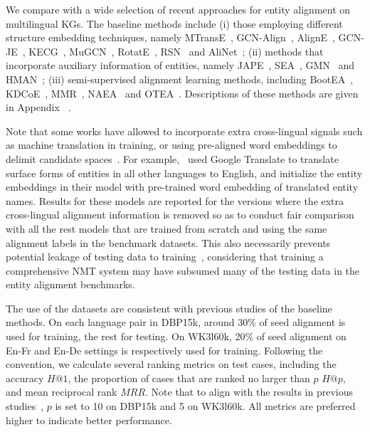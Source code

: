 \documentclass[11pt,a4paper]{article}
\makeatletter
\newcommand{\stitle}[1]{\vspace{2ex} \noindent{\bf #1}}
\def\hitsone{\mathit{H}\mbox{@}1}
\def\hitsk{\mathit{H}\mbox{@}p}
\def\mrr{\mathit{MRR}}
\makeatother
\begin{document}
\stitle{Baseline methods.}
We compare with a wide selection of recent approaches for entity alignment on multilingual KGs.
The baseline methods include (i) those employing different structure embedding techniques, namely 
MTransE~\cite{chen2017multigraph},  GCN-Align~\cite{wang2018cross}, AlignE~\cite{sun2018bootstrapping}, 
GCN-JE~\cite{wu2019jointly},
KECG~\cite{li2019semi},
MuGCN~\cite{cao2019multi}, RotatE~\cite{sun2019rotate}, 
RSN~\cite{guo2019learning} and AliNet~\cite{sun2020alinet}; 
(ii) methods that incorporate auxiliary information of entities, namely JAPE~\cite{sun2017cross}, SEA~\cite{pei2019deg}, GMN~\cite{xu2019cross} and HMAN~\cite{yang2019aligning};
(iii) semi-supervised alignment learning methods, including BootEA~\cite{sun2018bootstrapping}, KDCoE~\cite{chen2018co}, MMR~\cite{shi2019modeling}, NAEA~\cite{zhu2019neighborhood} and OTEA~\cite{pei2019transport}.
Descriptions of these methods are given in Appendix ~\cite{chen2021cross}.


Note that some works have allowed to incorporate extra cross-lingual signals such as machine translation in training, or using pre-aligned word embeddings to delimit candidate spaces~\cite{wu2019relation,wu2019jointly,xu2019cross}. For example,~\citet{wu2019relation,wu2019jointly} used Google Translate to translate surface forms of entities in all other languages to English, and initialize the entity embeddings in their model with pre-trained word embedding of translated entity names. 
Results for these models are reported for the versions where the extra cross-lingual alignment information
is removed so as to conduct fair comparison with all the rest models that are trained from scratch and using the same alignment labels in the benchmark datasets.
This also necessarily prevents potential leakage of testing data to training~\cite{liu2020exploring}, considering that  training a comprehensive NMT system may have subsumed many of the testing data in the entity alignment benchmarks.





\stitle{Evaluation protocols.} 
The use of the datasets are consistent with previous studies of the baseline methods.
On each language pair in DBP15k, around 30\% of seed alignment is used for training, the rest for testing.
On WK3l60k, 20\% of seed alignment on En-Fr and En-De settings is respectively used for training.
Following the convention, we calculate several ranking metrics on test cases, including the accuracy $\hitsone$, the proportion of cases that are ranked no larger than $p$ $\hitsk$, and mean reciprocal rank $\mrr$.
Note that to align with the results in previous studies~\cite{sun2020alinet,pei2019transport}, $p$ is set to 10 on DBP15k and 5 on WK3l60k.
All metrics are preferred higher to indicate better performance.
\end{document}
